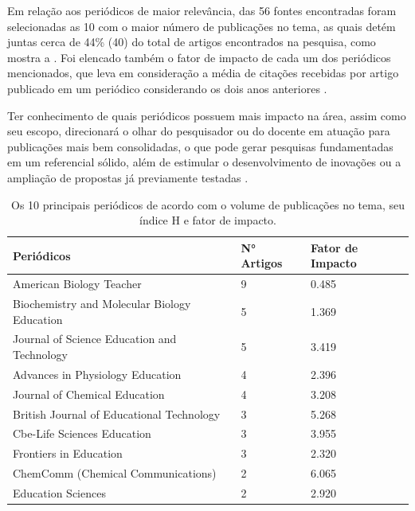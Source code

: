 \documentclass[portuguese]{textolivre}
\begin{document}
Em relação aos periódicos de maior relevância, das 56 fontes encontradas foram selecionadas as 10 com o maior número de publicações no tema, as quais detém juntas cerca de 44\% (40) do total de artigos encontrados na pesquisa, como mostra a . Foi elencado também o fator de impacto de cada um dos periódicos mencionados, que leva em consideração a média de citações recebidas por artigo publicado em um periódico considerando os dois anos anteriores \cite{silva_associacao_2018,agarwal_bibliometrics:_2016}.

Ter conhecimento de quais periódicos possuem mais impacto na área, assim como seu escopo, direcionará o olhar do pesquisador ou do docente em atuação para publicações mais bem consolidadas, o que pode gerar pesquisas fundamentadas em um referencial sólido, além de estimular o desenvolvimento de inovações ou a ampliação de propostas já previamente testadas \cite{pereira_ensino_2020}.

\begin{table}[h!]
\centering
\begin{threeparttable}
\caption{Os 10 principais periódicos de acordo com o volume de publicações no tema, seu índice H e fator de impacto.}
\label{tab1}
\begin{tabular}{l l l}
\toprule
 Periódicos & N° Artigos & Fator de Impacto \\
 \midrule
\rowcolor[HTML]{EFEFEF}American Biology Teacher & 9 & 0.485 \\
Biochemistry and Molecular Biology Education & 5 & 1.369 \\
\rowcolor[HTML]{EFEFEF}Journal of Science Education and Technology & 5 & 3.419 \\
Advances in Physiology Education & 4 & 2.396 \\
\rowcolor[HTML]{EFEFEF}Journal of Chemical Education & 4 & 3.208 \\
British Journal of Educational Technology & 3 & 5.268 \\
\rowcolor[HTML]{EFEFEF}Cbe-Life Sciences Education & 3 & 3.955 \\
Frontiers in Education & 3 & 2.320 \\
\rowcolor[HTML]{EFEFEF}ChemComm (Chemical Communications) & 2 & 6.065 \\
Education Sciences & 2 & 2.920 \\
\bottomrule
\end{tabular}
\end{threeparttable}
\end{table}
\end{document}
